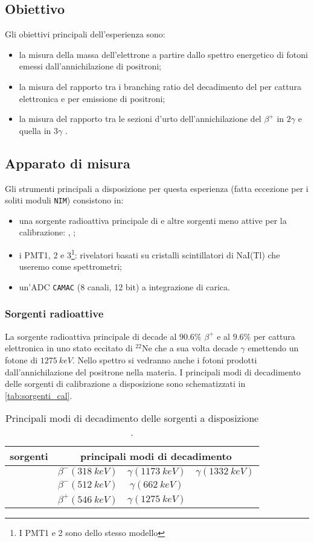 \subsection{Obiettivo}
Gli obiettivi principali dell'esperienza sono:
\begin{itemize}
	\item la misura della massa dell'elettrone a partire dallo spettro energetico di fotoni emessi dall'annichilazione di positroni;
	\item la misura del rapporto tra i branching ratio del decadimento del  \na\; per cattura elettronica e per emissione di positroni;
	\item la misura del rapporto tra le sezioni d'urto dell'annichilazione del $\beta^+$ in $2\gamma$ e quella in $3\gamma$ .
\end{itemize}

\subsection{Apparato di misura}
Gli strumenti principali a disposizione per questa esperienza (fatta eccezione per i soliti moduli \texttt{NIM}) consistono in:
\begin{itemize}
	\item una sorgente radioattiva principale di \na\; e altre sorgenti meno attive per la calibrazione: \cs\;, \co\;;
	\item i PMT1, 2 e 3\footnote{I PMT1 e 2 sono dello stesso modello}: rivelatori basati su cristalli scintillatori di NaI(Tl) che useremo come spettrometri;
	\item un'ADC \texttt{CAMAC} (8 canali, 12 bit) a integrazione di carica.
\end{itemize}

\subsubsection{Sorgenti radioattive}
La sorgente radioattiva principale di \na\; decade al $90.6\%$ $\beta^+$ e al $9.6\%$ per cattura elettronica in uno stato eccitato di $^{22}$Ne che a sua volta decade $\gamma$ emettendo un fotone di $\SI{1275}{keV}$. Nello spettro si vedranno anche i fotoni prodotti dall'annichilazione del positrone nella materia.
I principali modi di decadimento delle sorgenti di calibrazione a disposizione sono schematizzati in \autoref{tab:sorgenti_cal}.

\begin{table}[h]
	\centering
	\begin{tabular}{cccc}
		\toprule
		sorgenti & \multicolumn{3}{c}{principali modi di decadimento} \\
		\midrule
		\co & $\beta^{-} (\SI{318}{keV})$ & $\gamma (\SI{1173}{keV})$ & $\gamma (\SI{1332}{keV})$  \\
		\cs & $\beta^{-} (\SI{512}{keV})$ & $\gamma (\SI{662}{keV})$ \\
		\na & $\beta^{+} (\SI{546}{keV})$ & $\gamma (\SI{1275}{keV})$ \\
		\bottomrule
	\end{tabular}
	\caption{\label{tab:sorgenti_cal} Principali modi di decadimento delle sorgenti a disposizione \cite{2}.}
\end{table}

